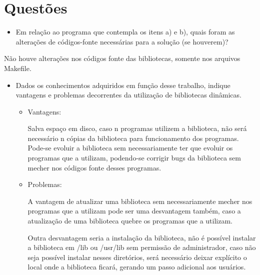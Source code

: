\chapter[Questões]{Questões}

\begin{itemize}
	\item Em relação ao programa que contempla os itens a) e b), quais foram as alterações
	de códigos-fonte necessárias para a solução (se houverem)?
\end{itemize}

Não houve alterações nos códigos fonte das bibliotecas, somente nos arquivos Makefile.

\begin{itemize}
	\item Dados os conhecimentos adquiridos em função desse trabalho, indique vantagens e problemas decorrentes da utilização de bibliotecas dinâmicas.

	\begin{itemize}

	\item Vantagens:

	Salva espaço em disco, caso n programas utilizem a biblioteca, não será necessário n cópias da biblioteca para funcionamento dos programas.
	Pode-se evoluir a biblioteca sem necessariamente ter que evoluir os programas que a utilizam, podendo-se corrigir bugs da biblioteca sem mecher nos códigos fonte desses programas.

	\item Problemas:

	A vantagem de atualizar uma biblioteca sem necessariamente mecher nos programas que a utilizam pode ser uma desvantagem também, caso a atualização de uma biblioteca quebre os programas que a utilizam. 

	Outra desvantagem seria a instalação da biblioteca, não é possível instalar a biblioteca em /lib ou /usr/lib sem permissão de administrador, caso não seja possível instalar nesses diretórios, será necessário deixar explícito o local onde a biblioteca ficará, gerando um passo adicional aos usuários.

	\end{itemize}

\end{itemize}




